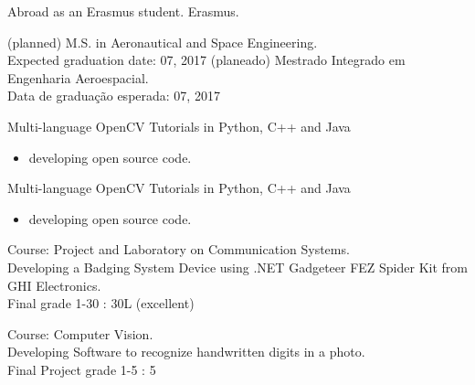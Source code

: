 \documentclass{article}
\begin{document}


\begin{llist}

 
{
Abroad as an Erasmus student.
}
{
Erasmus.
}

 
{
(planned) M.S. in Aeronautical and Space Engineering.\\
Expected graduation date: 07, 2017
}
{
(planeado) Mestrado Integrado em Engenharia Aeroespacial.\\
Data de gradua\c{c}\~{a}o esperada: 07, 2017
}

{
}
{
}
\vspace{-0.33cm}

{
Multi-language OpenCV Tutorials in Python, C++ and Java
\vspace{-0.33cm}
\begin{itemize}
 \item developing open source code.
\end{itemize}
}
{
Multi-language OpenCV Tutorials in Python, C++ and Java
\vspace{-0.33cm}
\begin{itemize}
 \item developing open source code.
\end{itemize}
}

{
\vspace{-0.4cm}

 
Course: Project and Laboratory on Communication	Systems.\\
Developing a Badging System Device using .NET Gadgeteer FEZ Spider Kit from GHI Electronics.\\
Final grade 1-30 : 30L (excellent)

 
Course: Computer Vision.\\
Developing Software to recognize handwritten digits in a photo.\\
Final Project grade 1-5 : 5

}
\end{llist}
\end{document}
